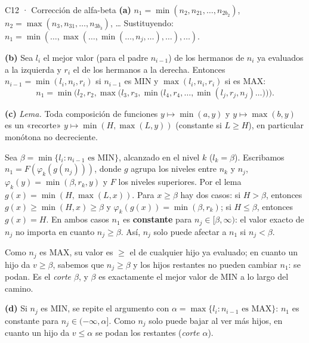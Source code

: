 \begin{solucion}{C12 · Corrección de alfa-beta}
\textbf{(a)} $n_1=\min(n_2,n_{21},\dots,n_{2b_2})$, $n_2=\max(n_3,n_{31},\dots,n_{3b_3})$, … Sustituyendo:
$n_1=\min(\dots,\max(\dots,\min(\dots,n_j,\dots),\dots),\dots)$.

\textbf{(b)} Sea $l_i$ el mejor valor (para el padre $n_{i-1}$) de los hermanos de $n_i$ ya evaluados a la
izquierda y $r_i$ el de los hermanos a la derecha. Entonces $n_{i-1}=\min(l_i,n_i,r_i)$ si $n_{i-1}$ es MIN y
$\max(l_i,n_i,r_i)$ si es MAX:
\[n_1=\min\big(l_2,r_2,\max\big(l_3,r_3,\min\big(l_4,r_4,\dots,\min(l_j,r_j,n_j)\dots\big)\big)\big).\]

\textbf{(c)} \emph{Lema.} Toda composición de funciones $y\mapsto\min(a,y)$ y $y\mapsto\max(b,y)$ es un
«recorte» $y\mapsto\min(H,\max(L,y))$ (constante si $L\ge H$), en particular monótona no decreciente.

Sea $\beta=\min\{l_i: n_{i-1}\text{ es MIN}\}$, alcanzado en el nivel $k$ ($l_k=\beta$). Escribamos
$n_1=F(\varphi_k(g(n_j)))$, donde $g$ agrupa los niveles entre $n_k$ y $n_j$, $\varphi_k(y)=\min(\beta,r_k,y)$
y $F$ los niveles superiores. Por el lema $g(x)=\min(H,\max(L,x))$. Para $x\ge\beta$ hay dos casos:
si $H>\beta$, entonces $g(x)\ge\min(H,x)\ge\beta$ y $\varphi_k(g(x))=\min(\beta,r_k)$; si $H\le\beta$, entonces
$g(x)=H$. En ambos casos $n_1$ es \textbf{constante} para $n_j\in[\beta,\infty)$: el valor exacto de $n_j$ no
importa en cuanto $n_j\ge\beta$. Así, $n_j$ solo puede afectar a $n_1$ si $n_j<\beta$.

Como $n_j$ es MAX, su valor es $\ge$ el de cualquier hijo ya evaluado; en cuanto un hijo da $v\ge\beta$,
sabemos que $n_j\ge\beta$ y los hijos restantes no pueden cambiar $n_1$: se podan. Es el \emph{corte
$\beta$}, y $\beta$ es exactamente el mejor valor de MIN a lo largo del camino.

\textbf{(d)} Si $n_j$ es MIN, se repite el argumento con $\alpha=\max\{l_i:n_{i-1}\text{ es MAX}\}$: $n_1$ es constante
para $n_j\in(-\infty,\alpha]$. Como $n_j$ solo puede bajar al ver más hijos, en cuanto un hijo da $v\le\alpha$ se
podan los restantes (\emph{corte $\alpha$}).
\end{solucion}


